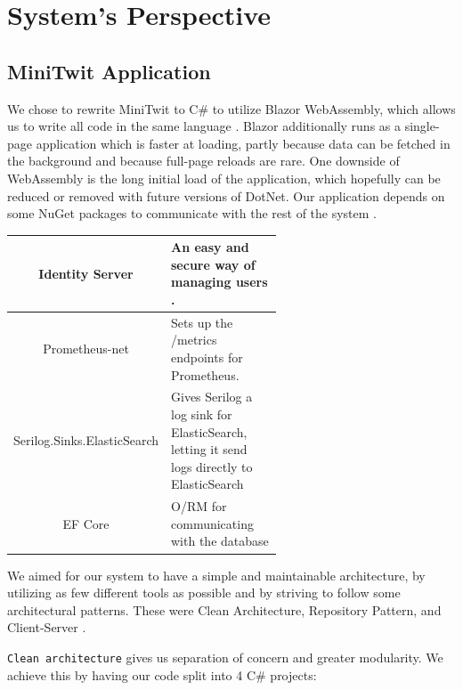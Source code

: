 \section{System's Perspective} 

\subsection{MiniTwit Application}
We chose to rewrite MiniTwit to C\# to utilize Blazor WebAssembly, which allows us to write all code in the same language \autocite{dotnetblazor, dotnet}. Blazor additionally runs as a single-page application which is faster at loading, partly because data can be fetched in the background and because full-page reloads are rare. One downside of WebAssembly is the long initial load of the application, which hopefully can be reduced or removed with future versions of DotNet.
Our application depends on some NuGet packages to communicate with the rest of the system \autocite{nuget}.

\begin{center}
\begin{tabular}{|c|p{0.6\linewidth}|}
    \hline
    Identity Server & An easy and secure way of managing users \autocite{duendeidentityserver}. \\
    \hline
    Prometheus-net & Sets up the  /metrics endpoints for Prometheus. \\
    \hline
    Serilog.Sinks.ElasticSearch & Gives Serilog a log sink for ElasticSearch, letting it send logs directly to ElasticSearch \\
    \hline
    EF Core & O/RM for communicating with the database\\
    \hline
\end{tabular}
\end{center}


We aimed for our system to have a simple and maintainable architecture, by utilizing as few different tools as possible and by striving to follow some architectural patterns. These were Clean Architecture, Repository Pattern, and Client-Server \autocite{clean-architecture, repository-pattern, client-server-architecture}. 

\texttt{Clean architecture} gives us separation of concern and greater modularity. We achieve this by having our code split into 4 C\# projects:

